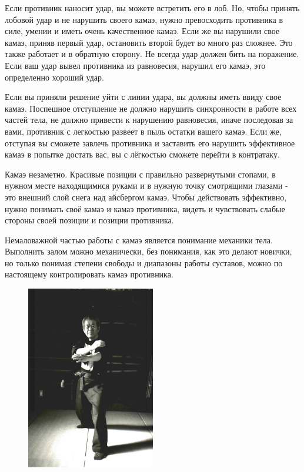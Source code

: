 \documentclass[russian,]{article}
\begin{document}
Если противник наносит удар, вы можете встретить его в лоб. Но, чтобы принять лобовой удар и не нарушить своего камаэ, нужно превосходить противника в силе, умении и иметь очень качественное камаэ. Если же вы нарушили свое камаэ, приняв первый удар, остановить второй будет во много раз сложнее. Это также работает и в обратную сторону. Не всегда удар должен бить на поражение. Если ваш удар вывел противника из равновесия, нарушил его камаэ, это определенно хороший удар.

Если вы приняли решение уйти с линии удара, вы должны иметь ввиду свое камаэ. Поспешное отступление не должно нарушить синхронности в работе всех частей тела, не должно привести к нарушению равновесия, иначе последовав за вами, противник с легкостью развеет в пыль остатки вашего камаэ. Если же, отступая вы сможете завлечь противника и заставить его нарушить эффективное камаэ в попытке достать вас, вы с лёгкостью сможете перейти в контратаку.

Камаэ незаметно. Красивые позиции с правильно развернутыми стопами, в нужном месте находящимися руками и в нужную точку смотрящими глазами - это внешний слой снега над айсбергом камаэ. Чтобы действовать эффективно, нужно понимать своё камаэ и камаэ противника, видеть и чувствовать слабые стороны своей позиции и позиции противника.

Немаловажной частью работы с камаэ является понимание механики тела. Выполнить залом можно механически, без понимания, как это делают новички, но только понимая степени свободы и диапазоны работы суставов, можно по настоящему контролировать камаэ противника.

\begin{figure}
\centering
\includegraphics[width=0.5\textwidth]{kamae_img.eps}
\end{figure}
\end{document}
